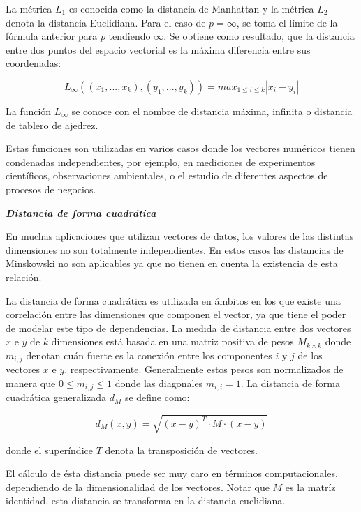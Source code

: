 La m\'etrica $L_1$ es conocida como la distancia de Manhattan y la m\'etrica
 $L_2$ denota la distancia Euclidiana.
Para el caso de $p=\infty$, se toma el l\'imite de la f\'ormula anterior para $p$ tendiendo $
\infty$. Se obtiene como resultado, que la distancia entre dos puntos del espacio vectorial es la 
m\'axima diferencia entre sus coordenadas:

\[
L_{\infty}((x_1,...,x_k), (y_1,...,y_k)) = max_{1 \leq i \leq k} |x_i - y_i |
\]

 
 La funci\'on $L_{\infty}$ se conoce con el nombre de  distancia m\'axima, infinita o distancia de tablero de ajedrez.

Estas funciones son utilizadas en varios casos donde los vectores num\'ericos 
tienen condenadas independientes, por ejemplo, en mediciones de experimentos cient\'ificos, observaciones ambientales, o el estudio de diferentes aspectos de procesos de negocios.

\noindent \textbf{\textit{Distancia de  forma cuadr\'atica}}

En muchas aplicaciones que utilizan vectores de datos, los valores de las distintas 
dimensiones no son totalmente independientes. En estos casos las distancias de Minskowski
no son aplicables ya que no tienen en cuenta la existencia de esta relaci\'on.

La distancia de forma cuadr\'atica  es utilizada en \'ambitos en los que existe
 una correlaci\'on entre  las dimensiones que componen el vector, ya que tiene 
 el poder de modelar este tipo de  dependencias. La medida de distancia entre 
 dos vectores $\bar{x}$ e $\bar{y}$  de $k$ dimensiones est\'a basada en una matriz
 positiva de pesos   $M_{k \times k}$ donde 
$m_{i,j}$  denotan cu\'an fuerte es la conexi\'on entre los componentes $i$ y $j$ de los vectores 
$\bar{x}$ e $\bar{y}$, respectivamente. Generalmente estos pesos son normalizados de manera que 
$0\leq m_{i,j} \leq 1$ donde las diagonales $m_{i,	i} = 1$.
La distancia de forma  cuadr\'atica generalizada $d_M$ se define como:

\[
d_M(\bar{x},\bar{y}) = \sqrt{(\bar{x} - \bar{y})^T \cdot M \cdot (\bar{x} - \bar{y})}
\]

\noindent donde el super\'indice $T$ denota la transposici\'on de vectores.

El c\'alculo de \'esta distancia puede ser muy caro en t\'erminos computacionales, dependiendo de la dimensionalidad de los vectores.
Notar que $M$ es la matr\'iz identidad, esta distancia se transforma en la distancia
euclidiana.

